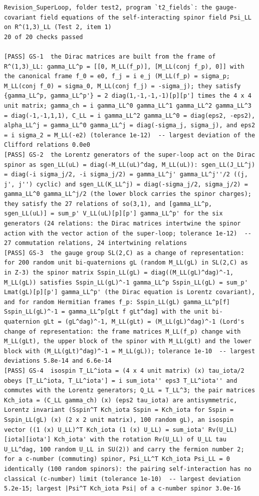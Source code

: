 \documentclass[
  10pt,
]{article}
\begin{document}
\begin{verbatim}
Revision_SuperLoop, folder test2, program `t2_fields`: the gauge-covariant field equations of the self-interacting spinor field Psi_LL on R^(1,3)_LL (Test 2, item 1)
20 of 20 checks passed

[PASS] GS-1  the Dirac matrices are built from the frame of R^(1,3)_LL: gamma_LL^p = [[0, M_LL(f_p)], [M_LL(conj f_p), 0]] with the canonical frame f_0 = e0, f_j = i e_j (M_LL(f_p) = sigma_p; M_LL(conj f_0) = sigma_0, M_LL(conj f_j) = -sigma_j); they satisfy {gamma_LL^p, gamma_LL^p'} = 2 diag(1,-1,-1,-1)[p][p'] times the 4 x 4 unit matrix; gamma_ch = i gamma_LL^0 gamma_LL^1 gamma_LL^2 gamma_LL^3 = diag(-1,-1,1,1), C_LL = i gamma_LL^2 gamma_LL^0 = diag(eps2, -eps2), alpha_LL^j = gamma_LL^0 gamma_LL^j = diag(-sigma_j, sigma_j), and eps2 = i sigma_2 = M_LL(-e2) (tolerance 1e-12)  -- largest deviation of the Clifford relations 0.0e0
[PASS] GS-2  the Lorentz generators of the super-loop act on the Dirac spinor as sgen_LL(uL) = diag(-M_LL(uL)^dag, M_LL(uL)): sgen_LL(J_LL^j) = diag(-i sigma_j/2, -i sigma_j/2) = gamma_LL^j' gamma_LL^j''/2 ((j, j', j'') cyclic) and sgen_LL(K_LL^j) = diag(-sigma_j/2, sigma_j/2) = gamma_LL^0 gamma_LL^j/2 (the lower block carries the spinor charges); they satisfy the 27 relations of so(3,1), and [gamma_LL^p, sgen_LL(uL)] = sum_p' V_LL(uL)[p][p'] gamma_LL^p' for the six generators (24 relations: the Dirac matrices intertwine the spinor action with the vector action of the super-loop; tolerance 1e-12)  -- 27 commutation relations, 24 intertwining relations
[PASS] GS-3  the gauge group SL(2,C) as a change of representation: for 200 random unit bi-quaternions gL (random M_LL(gL) in SL(2,C) as in Z-3) the spinor matrix Sspin_LL(gL) = diag((M_LL(gL)^dag)^-1, M_LL(gL)) satisfies Sspin_LL(gL)^-1 gamma_LL^p Sspin_LL(gL) = sum_p' Lmat(gL)[p][p'] gamma_LL^p' (the Dirac equation is Lorentz covariant), and for random Hermitian frames f_p: Sspin_LL(gL) gamma_LL^p[f] Sspin_LL(gL)^-1 = gamma_LL^p[gLt f gLt^dag] with the unit bi-quaternion gLt = (gL^dag)^-1, M_LL(gLt) = (M_LL(gL)^dag)^-1 (Lord's change of representation: the frame matrices M_LL(f_p) change with M_LL(gLt), the upper block of the spinor with M_LL(gLt) and the lower block with (M_LL(gLt)^dag)^-1 = M_LL(gL)); tolerance 1e-10  -- largest deviations 5.8e-14 and 6.6e-14
[PASS] GS-4  isospin T_LL^iota = (4 x 4 unit matrix) (x) tau_iota/2 obeys [T_LL^iota, T_LL^iota'] = i sum_iota'' eps3 T_LL^iota'' and commutes with the Lorentz generators; Q_LL = T_LL^3; the pair matrices Kch_iota = (C_LL gamma_ch) (x) (eps2 tau_iota) are antisymmetric, Lorentz invariant (Sspin^T Kch_iota Sspin = Kch_iota for Sspin = Sspin_LL(gL) (x) (2 x 2 unit matrix), 100 random gL), an isospin vector ((1 (x) U_LL)^T Kch_iota (1 (x) U_LL) = sum_iota' Rv(U_LL)[iota][iota'] Kch_iota' with the rotation Rv(U_LL) of U_LL tau U_LL^dag, 100 random U_LL in SU(2)) and carry the fermion number 2; for a c-number (commuting) spinor, Psi_LL^T Kch_iota Psi_LL = 0 identically (100 random spinors): the pairing self-interaction has no classical (c-number) limit (tolerance 1e-10)  -- largest deviation 5.2e-15; largest |Psi^T Kch_iota Psi| of a c-number spinor 3.0e-16

\end{verbatim}
\end{document}
